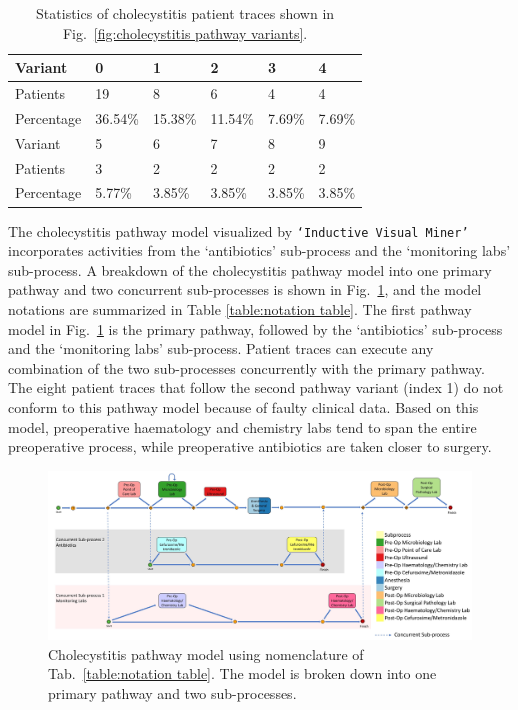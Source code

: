 \begin{table}[t]
\centering
\caption{Statistics of cholecystitis patient traces shown in Fig.~\ref{fig:cholecystitis pathway variants}.}
\label{table:cholecystitis variant table}
\begin{tabular}{llllll}
  \hline
  \hline
Variant &     0  &     1  &     2  &     3  &    4\\
\hline
Patients   &    19 &     8 &     6 &     4 &    4\\
  Percentage &  36.54\% &  15.38\% &  11.54\% &  7.69\% &  7.69\%\\
  \hline
  \hline
Variant &     5  &    6  &    7  &    8 &    9\\
\hline
Patients   &   3 &     2 &     2 &     2 &     2 \\
Percentage &  5.77\% &  3.85\% &  3.85\% &  3.85\% &  3.85\% \\
  \hline
  \hline
\end{tabular}
\end{table}

The cholecystitis pathway model visualized by \texttt{`Inductive Visual Miner'} incorporates activities from the `antibiotics' sub-process and the `monitoring labs' sub-process. A breakdown of the cholecystitis pathway model into one primary pathway and two concurrent sub-processes is shown in Fig.~\ref{fig:cholecystitis pathway model}, and the model notations are summarized in Table \ref{table:notation table}. The first pathway model in Fig.~\ref{fig:cholecystitis pathway model} is the primary pathway, followed by the `antibiotics’ sub-process and the `monitoring labs’ sub-process. Patient traces can execute any combination of the two sub-processes concurrently with the primary pathway. The eight patient traces that follow the second pathway variant (index 1) do not conform to this pathway model because of faulty clinical data. Based on this model, preoperative haematology and chemistry labs tend to span the entire preoperative process, while preoperative antibiotics are taken closer to surgery.

\begin{figure}[t]
\centering
\includegraphics[width=18cm,angle=270]{images/communicative_cholecystitis_process_models_anes.jpg}
\caption{Cholecystitis pathway model using nomenclature of Tab.~\ref{table:notation table}. The model is broken down into one primary pathway and two sub-processes.}
\label{fig:cholecystitis pathway model}
\end{figure}

